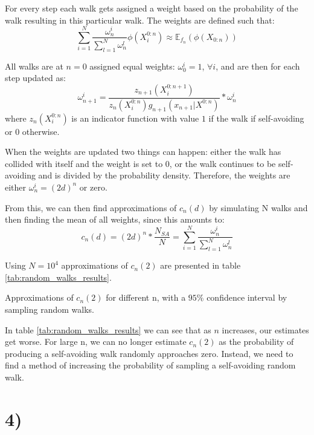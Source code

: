 \documentclass[a4paper]{article}
\begin{document}
For every step each walk gets assigned a weight based on the probability of the walk resulting in this particular walk. The weights are defined such that:
\begin{equation}
    \sum_{i = 1}^N\frac{\omega_n^i}{\sum_{l=1}^N\omega_n^l}\phi(X_i^{0:n}) \approx \mathbb{E}_{f_n}(\phi(X_{0:n})) 
\end{equation}

All walks are at $n = 0$ assigned equal weights: $\omega_0^i = 1$, $\forall i$, and are then for each step updated as:
\begin{equation}
    \label{eq:weights}
    \omega_{n+1}^i = \frac{z_{n+1}(X_i^{0:n+1})}{z_{n}(X_i^{0:n})g_{n+1}(x_{n+1}|X^{0:n})} * \omega_n^i
\end{equation}
where $z_n(X_i^{0:n})$ is an indicator function with value $1$ if the walk if self-avoiding or $0$ otherwise.

When the weights are updated two things can happen: either the walk has collided with itself and the weight is set to $0$, or the walk continues to be self-avoiding and is divided by the probability density. Therefore, the weights are either $\omega_n^i = (2d)^n$ or zero.

From this, we can then find approximations of $c_n(d)$ by simulating N walks and then finding the mean of all weights, since this amounts to:
\begin{equation}
    \label{eq:cn}
    c_n(d) = (2d)^n*\frac{N_{SA}}{N} = \sum_{i = 1}^N\frac{\omega_n^i}{\sum_{l=1}^N\omega_n^l}
\end{equation}

Using $N = 10^4$ approximations of $c_n(2)$ are presented in table \ref{tab:random_walks_results}.

\begin{table}[H]
    \centering
    \caption{Approximations of $c_n(2)$ for different n, with a $95\%$ confidence interval by sampling random walks.}
    \label{tab:random_walks_results}
    
\end{table}

In table \ref{tab:random_walks_results} we can see that as $n$ increases, our estimates get worse. For large n, we can no longer estimate $c_n(2)$ as the probability of producing a self-avoiding walk randomly approaches zero. Instead, we need to find a method of increasing the probability of sampling a self-avoiding random walk.

\section*{4)}
\end{document}
